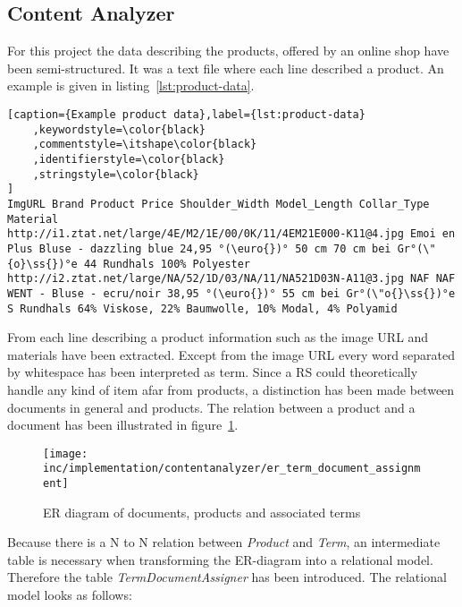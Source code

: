 
\subsection{Content Analyzer}
\label{sec:content-analyzer}
For this project the data describing the products, offered by an online shop have been semi-structured.
It was a text file where each line described a product.
An example is given in listing~\ref{lst:product-data}.

\begin{lstlisting}[caption={Example product data},label={lst:product-data}
    ,keywordstyle=\color{black}
    ,commentstyle=\itshape\color{black}
    ,identifierstyle=\color{black}
    ,stringstyle=\color{black}
]
ImgURL Brand Product Price Shoulder_Width Model_Length Collar_Type Material
http://i1.ztat.net/large/4E/M2/1E/00/0K/11/4EM21E000-K11@4.jpg Emoi en Plus Bluse - dazzling blue 24,95 °(\euro{})° 50 cm 70 cm bei Gr°(\"{o}\ss{})°e 44 Rundhals 100% Polyester
http://i2.ztat.net/large/NA/52/1D/03/NA/11/NA521D03N-A11@3.jpg NAF NAF WENT - Bluse - ecru/noir 38,95 °(\euro{})° 55 cm bei Gr°(\"o{}\ss{})°e S Rundhals 64% Viskose, 22% Baumwolle, 10% Modal, 4% Polyamid
\end{lstlisting}

From each line describing a product information such as the image URL and materials have been extracted.
Except from the image URL every word separated by whitespace has been interpreted as term.
Since a RS could theoretically handle any kind of item afar from products, a distinction has been made between documents in general and products.
The relation between a product and a document has been illustrated in figure~\ref{fig:ertermdocumentassignment}.
\begin{figure}[h]
    \center
    \texttt{[image: inc/implementation/contentanalyzer/er\_term\_document\_assignment]}
    \caption{ER diagram of documents, products and associated terms}
    \label{fig:ertermdocumentassignment}
\end{figure}
Because there is a N to N relation between \textit{Product} and \textit{Term}, an intermediate table is necessary when transforming the ER-diagram into a relational model.
Therefore the table \textit{TermDocumentAssigner} has been introduced.
The relational model looks as follows:

